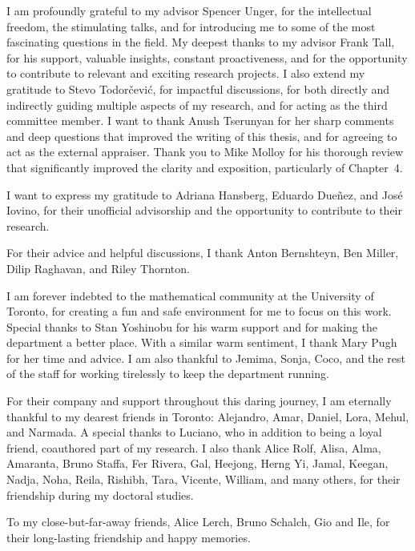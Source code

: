 
\begin{acknowledgements}
    I am profoundly grateful to my advisor Spencer Unger, for the intellectual freedom, the stimulating talks, and for introducing me to some of the most fascinating questions in the field.
    My deepest thanks to my advisor Frank Tall, for his support, valuable insights, constant proactiveness, and for the opportunity to contribute to relevant and exciting research projects.
    I also extend my gratitude to Stevo Todor{\v{c}}evi{\'c}, for impactful discussions, for both directly and indirectly guiding multiple aspects of my research, and for acting as the third committee member.
    I want to thank Anush Tserunyan for her sharp comments and deep questions that improved the writing of this thesis, and for agreeing to act as the external appraiser.
    Thank you to Mike Molloy for his thorough review that significantly improved the clarity and exposition, particularly of Chapter~4.

    I want to express my gratitude to Adriana Hansberg, Eduardo Due{\~n}ez, and Jos{\'e} Iovino, for their unofficial advisorship and the opportunity to contribute to their research.

    For their advice and helpful discussions, I thank Anton Bernshteyn, Ben Miller, Dilip Raghavan, and Riley Thornton.

    I am forever indebted to the mathematical community at the University of Toronto, for creating a fun and safe environment for me to focus on this work.
    Special thanks to Stan Yoshinobu for his warm support and for making the department a better place.
    With a similar warm sentiment, I thank Mary Pugh for her time and advice.
    I am also thankful to Jemima, Sonja, Coco, and the rest of the staff for working tirelessly to keep the department running.

    For their company and support throughout this daring journey, I am eternally thankful to my dearest friends in Toronto: Alejandro, Amar, Daniel, Lora, Mehul, and Narmada.
    A special thanks to Luciano, who in addition to being a loyal friend, coauthored part of my research.
    I also thank Alice Rolf, Alisa, Alma, Amaranta, Bruno Staffa, Fer Rivera, Gal, Heejong, Herng Yi, Jamal, Keegan, Nadja, Noha, Reila, Rishibh, Tara, Vicente, William, and many others, for their friendship during my doctoral studies.

    To my close-but-far-away friends, Alice Lerch, Bruno Schalch, Gio and Ile, for their long-lasting friendship and happy memories.


\end{acknowledgements}
